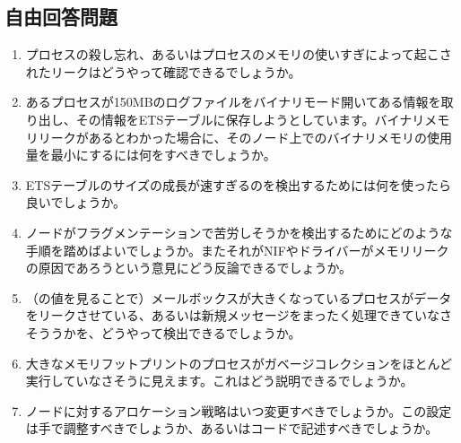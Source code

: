 \subsection*{自由回答問題}

\begin{enumerate}
  \item プロセスの殺し忘れ、あるいはプロセスのメモリの使いすぎによって起こされたリークはどうやって確認できるでしょうか。
  \item あるプロセスが150MBのログファイルをバイナリモード開いてある情報を取り出し、その情報をETSテーブルに保存しようとしています。バイナリメモリリークがあるとわかった場合に、そのノード上でのバイナリメモリの使用量を最小にするには何をすべきでしょうか。
  \item ETSテーブルのサイズの成長が速すぎるのを検出するためには何を使ったら良いでしょうか。
  \item ノードがフラグメンテーションで苦労しそうかを検出するためにどのような手順を踏めばよいでしょうか。またそれがNIFやドライバーがメモリリークの原因であろうという意見にどう反論できるでしょうか。
  \item （の値を見ることで）メールボックスが大きくなっているプロセスがデータをリークさせている、あるいは新規メッセージをまったく処理できていなさそううかを、どうやって検出できるでしょうか。
  \item 大きなメモリフットプリントのプロセスがガベージコレクションをほとんど実行していなさそうに見えます。これはどう説明できるでしょうか。
  \item ノードに対するアロケーション戦略はいつ変更すべきでしょうか。この設定は手で調整すべきでしょうか、あるいはコードで記述すべきでしょうか。
\end{enumerate}

